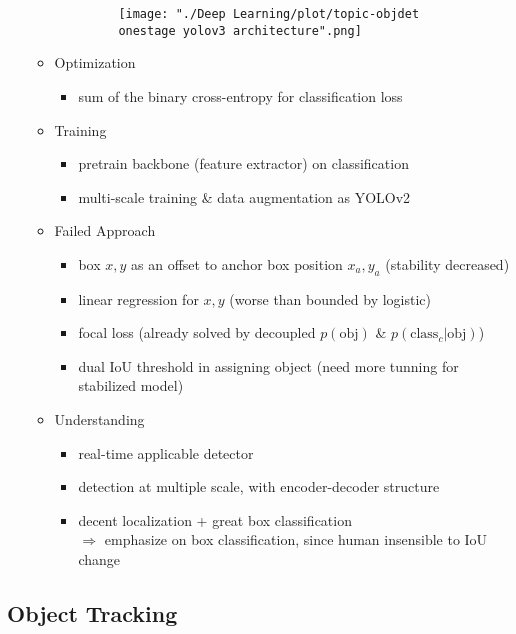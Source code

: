 \begin{itemize}
\begin{itemize}
\begin{itemize}
\begin{figure}[ht]
		\texttt{[image: "./Deep Learning/plot/topic-objdet onestage yolov3 architecture".png]}
		\end{figure}
		\end{itemize}
	\item Optimization
		\begin{itemize}
		\item sum of the binary cross-entropy for classification loss
		\end{itemize}
	\item Training
		\begin{itemize}
		\item pretrain backbone (feature extractor) on classification
		\item multi-scale training \& data augmentation as YOLOv2
		\end{itemize}
	\item Failed Approach
		\begin{itemize}
		\item box $x,y$ as an offset to anchor box position $x_a,y_a$ (stability decreased)
		\item linear regression for $x,y$ (worse than bounded by logistic)
		\item focal loss (already solved by decoupled $p(\text{obj})$ \& $p(\text{class}_c|\text{obj})$)
		\item dual IoU threshold in assigning object (need more tunning for stabilized model)
		\end{itemize}
	\item Understanding
		\begin{itemize}
		\item real-time applicable detector
		\item detection at multiple scale, with encoder-decoder structure
		\item decent localization + great box classification \\
		$\Rightarrow$ emphasize on box classification, since human insensible to IoU change
		\end{itemize}
	\end{itemize}
\end{itemize}

\subsection{Object Tracking}
